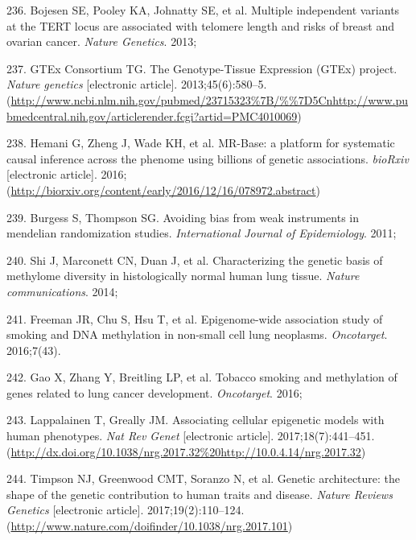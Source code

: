 \documentclass[11pt,oneside]{bristolthesis}
\newenvironment{cslreferences}%
  {}%
  {\par}
\begin{document}
\begin{cslreferences}
\leavevmode\hypertarget{ref-Bojesen2013}{}%
236. Bojesen SE, Pooley KA, Johnatty SE, et al. Multiple independent variants at the TERT locus are associated with telomere length and risks of breast and ovarian cancer. \emph{Nature Genetics}. 2013;

\leavevmode\hypertarget{ref-GTExConsortium2013}{}%
237. GTEx Consortium TG. The Genotype-Tissue Expression (GTEx) project. \emph{Nature genetics} {[}electronic article{]}. 2013;45(6):580--5. (\url{http://www.ncbi.nlm.nih.gov/pubmed/23715323\%7B/\%\%7D5Cnhttp://www.pubmedcentral.nih.gov/articlerender.fcgi?artid=PMC4010069})

\leavevmode\hypertarget{ref-Hemani2016}{}%
238. Hemani G, Zheng J, Wade KH, et al. MR-Base: a platform for systematic causal inference across the phenome using billions of genetic associations. \emph{bioRxiv} {[}electronic article{]}. 2016;(\url{http://biorxiv.org/content/early/2016/12/16/078972.abstract})

\leavevmode\hypertarget{ref-Burgess2011}{}%
239. Burgess S, Thompson SG. Avoiding bias from weak instruments in mendelian randomization studies. \emph{International Journal of Epidemiology}. 2011;

\leavevmode\hypertarget{ref-Shi2014}{}%
240. Shi J, Marconett CN, Duan J, et al. Characterizing the genetic basis of methylome diversity in histologically normal human lung tissue. \emph{Nature communications}. 2014;

\leavevmode\hypertarget{ref-Freeman2016}{}%
241. Freeman JR, Chu S, Hsu T, et al. Epigenome-wide association study of smoking and DNA methylation in non-small cell lung neoplasms. \emph{Oncotarget}. 2016;7(43).

\leavevmode\hypertarget{ref-Gao2016}{}%
242. Gao X, Zhang Y, Breitling LP, et al. Tobacco smoking and methylation of genes related to lung cancer development. \emph{Oncotarget}. 2016;

\leavevmode\hypertarget{ref-Lappalainen2017}{}%
243. Lappalainen T, Greally JM. Associating cellular epigenetic models with human phenotypes. \emph{Nat Rev Genet} {[}electronic article{]}. 2017;18(7):441--451. (\url{http://dx.doi.org/10.1038/nrg.2017.32\%20http://10.0.4.14/nrg.2017.32})

\leavevmode\hypertarget{ref-Timpson2017}{}%
244. Timpson NJ, Greenwood CMT, Soranzo N, et al. Genetic architecture: the shape of the genetic contribution to human traits and disease. \emph{Nature Reviews Genetics} {[}electronic article{]}. 2017;19(2):110--124. (\url{http://www.nature.com/doifinder/10.1038/nrg.2017.101})


\end{cslreferences}
\end{document}
